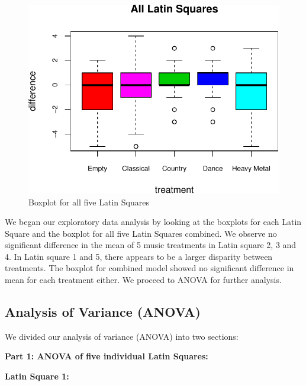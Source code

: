 \documentclass[]{article}
\begin{document}
\begin{figure}
\centering
\includegraphics{music_memory_files/figure-latex/unnamed-chunk-5-1.pdf}
\caption{Boxplot for all five Latin Squares}
\end{figure}

We began our exploratory data analysis by looking at the boxplots for
each Latin Square and the boxplot for all five Latin Squares combined.
We observe no significant difference in the mean of 5 music treatments
in Latin square 2, 3 and 4. In Latin square 1 and 5, there appears to be
a larger disparity between treatments. The boxplot for combined model
showed no significant difference in mean for each treatment either. We
proceed to ANOVA for further analysis.

\subsection{Analysis of Variance
(ANOVA)}\label{analysis-of-variance-anova}

We divided our analysis of variance (ANOVA) into two sections:

\textbf{Part 1: ANOVA of five individual Latin Squares:}

\textbf{Latin Square 1:}
\end{document}
